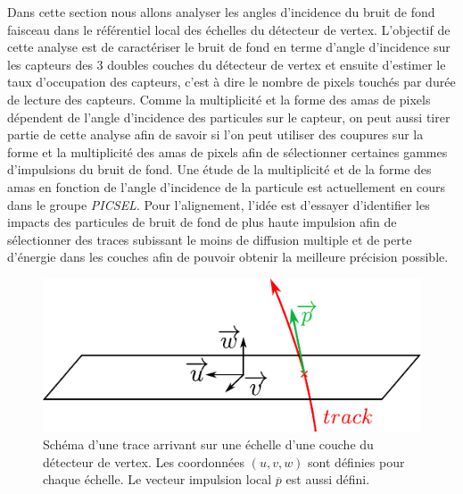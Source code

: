   Dans cette section nous allons analyser les angles d'incidence du bruit de fond faisceau dans le r\'ef\'erentiel local des \'echelles du d\'etecteur de vertex. L'objectif de cette analyse est de caract\'eriser le bruit de fond en terme d'angle d'incidence sur les capteurs des 3 doubles couches du d\'etecteur de vertex et ensuite  d'estimer le taux d'occupation des capteurs, c'est \`a dire le nombre de pixels touch\'es par dur\'ee de lecture des capteurs. Comme la multiplicit\'e et la forme des amas de pixels d\'ependent de  l'angle d'incidence des particules sur le capteur, on peut aussi tirer partie de cette analyse afin de savoir si l'on peut utiliser des coupures sur la forme et la multiplicit\'e des amas de pixels afin de sélectionner certaines gammes d'impulsions du bruit de fond. Une \'etude de la multiplicit\'e et de la forme des amas en fonction de l'angle d'incidence de la particule est actuellement en cours dans le groupe \textit{PICSEL}. Pour l'alignement, l'id\'ee est d'essayer d'identifier les impacts des particules de bruit de fond de plus haute impulsion afin de sélectionner des traces subissant le moins de diffusion multiple et de perte d'\'energie dans les couches afin de pouvoir obtenir la meilleure pr\'ecision possible.

  \medskip

  \begin{figure}[!htb]
    \begin{center}
      \includegraphics[scale=1.2]{./figures/localFrame_global_schema.pdf}
      \caption{Sch\'ema d'une trace arrivant sur une \'echelle d'une couche du d\'etecteur de vertex. Les coordonn\'ees $(u,v,w)$ sont d\'efinies pour chaque \'echelle. Le vecteur impulsion local $\overline{p}$ est aussi d\'efini.}
      \label{fig:LocalCoordMomentum}
    \end{center}
  \end{figure}

